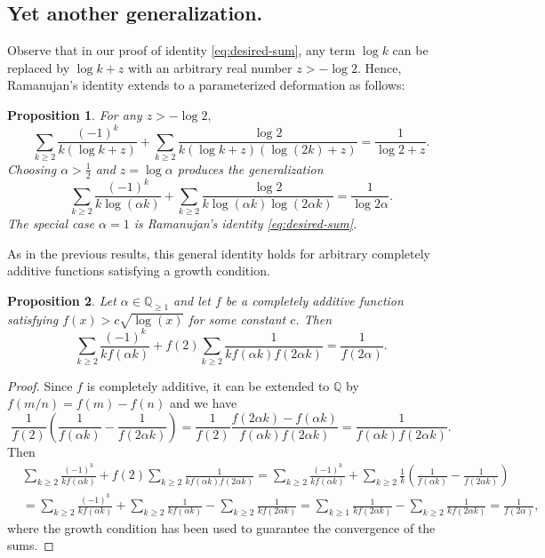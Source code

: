 \documentclass[11pt,oneside,reqno]{article}
\newtheorem*{proposition}{Proposition}
\theoremstyle{definition}
\begin{document}
\subsection{Yet another generalization.}

Observe that in our proof of identity \eqref{eq:desired-sum}, any term $\log k$ can be replaced by $\log k +z$ with an arbitrary real number $z>-\log2.$ Hence, Ramanujan's identity extends to a
parameterized deformation as follows:
\begin{proposition}
For any $z>-\log2,$
\begin{equation}
\sum_{k\ge2}\frac{\left(-1\right)^{k}}{k\left(\log k+z\right)}+\sum_{k\ge2}\frac{\log2}{k\left(\log k+z\right)\left(\log\left(2k\right)+z\right)}=\frac{1}{\log2+z}.
\end{equation}
Choosing $\alpha>\frac{1}{2}$ and $z=\log\alpha$ produces the generalization
\begin{equation}
\sum_{k\ge2}\frac{\left(-1\right)^{k}}{k\log\left(\alpha k\right)}+\sum_{k\ge2}\frac{\log2}{k\log\left(\alpha k\right)\log\left(2\alpha k\right)}=\frac{1}{\log2\alpha}.
\end{equation}
The special case $\alpha=1$ is Ramanujan's identity \eqref{eq:desired-sum}.
\end{proposition}

As in the previous results, this general identity holds for arbitrary completely additive functions satisfying a growth condition.
\begin{proposition}
    Let $\alpha\in\mathbb{Q}_{\ge1}$ and let $f$ be a completely additive function satisfying $f(x)>c\sqrt{\log(x)}$ for some constant $c$. Then
    \begin{equation}
        \sum_{k\ge2}\frac{(-1)^k}{kf(\alpha k)}+f(2)\sum_{k\ge2}\frac{1}{kf(\alpha k)f(2\alpha k)}=\frac{1}{f(2\alpha)}.
    \end{equation}
\end{proposition}
\begin{proof}
    Since $f$ is completely additive, it can be extended to $\mathbb{Q}$ by $f(m/n)=f(m)-f(n)$ and we have
    \begin{equation}
    \nonumber
        \frac{1}{f(2)}\left(\frac{1}{f(\alpha k)}-\frac{1}{f(2\alpha k)}\right)=\frac{1}{f(2)}\frac{f(2\alpha k)-f(\alpha k)}{f(\alpha k)f(2\alpha k)}=\frac{1}{f(\alpha k)f(2\alpha k)}.
    \end{equation}
    Then
    \begin{align}
    \nonumber
        &\sum_{k\ge2}\frac{(-1)^k}{kf(\alpha k)}+f(2)\sum_{k\ge2}\frac{1}{kf(\alpha k)f(2\alpha k)}=
        \sum_{k\ge2}\frac{(-1)^k}{kf(\alpha k)}+\sum_{k\ge2}\frac{1}{k}\left(\frac{1}{f(\alpha k)}-\frac{1}{f(2\alpha k)}\right)\\
        \nonumber
        &=\sum_{k\ge2}\frac{(-1)^k}{kf(\alpha k)}+\sum_{k\ge2}\frac{1}{kf(\alpha k)}-\sum_{k\ge2}\frac{1}{kf(2\alpha k)}
        =\sum_{k\ge1}\frac{1}{kf(2\alpha k)}-\sum_{k\ge2}\frac{1}{kf(2\alpha k)}=\frac{1}{f(2\alpha)},
    \end{align}
    where the growth condition has been used to guarantee the convergence of the sums.
\end{proof}
\end{document}
